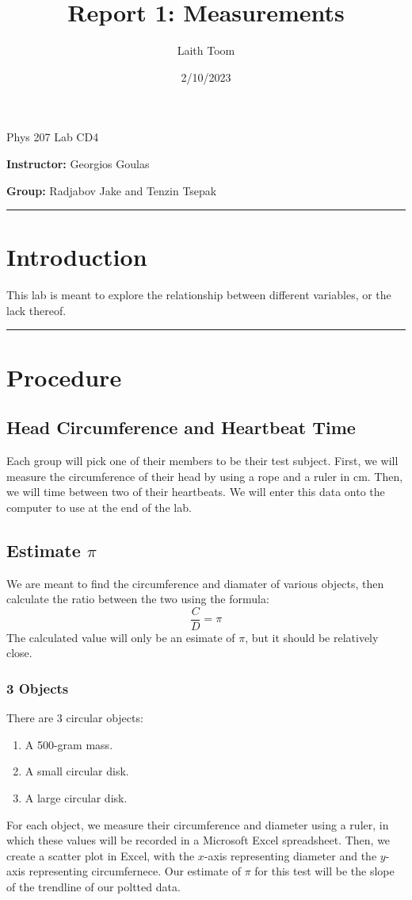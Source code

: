 \documentclass{article}
\title{Report 1: Measurements}
\date{2/10/2023}
\author{Laith Toom}
\begin{document}
\maketitle 

\noindent Phys 207 Lab CD4

\noindent \textbf{Instructor:} Georgios Goulas

\noindent \textbf{Group:} Radjabov Jake and Tenzin Tsepak

\vspace{1em}
\hrule
\section{Introduction}
This lab is meant to explore the relationship between different variables, 
or the lack thereof.

\vspace{1em}
\hrule
\section{Procedure}

\subsection{Head Circumference and Heartbeat Time}
Each group will pick one of their members to be their test subject. First, we will measure the 
circumference of their head by using a rope and a ruler in cm. Then, we will time between 
two of their heartbeats. We will enter this data onto the computer to use at the end of the lab.

\subsection{Estimate $\pi$}
We are meant to find the circumference and diamater of various objects, then calculate 
the ratio between the two using the formula:
\[ \frac{C}{D}=\pi \]
The calculated value will only be an esimate of $\pi$, but it should be relatively close.

\subsubsection{3 Objects}
There are 3 circular objects:
\begin{enumerate}
    \item A 500-gram mass.
    \item A small circular disk.
    \item A large circular disk.
\end{enumerate}
For each object, we measure their circumference and diameter using a ruler, in which these values
will be recorded in a Microsoft Excel spreadsheet. Then, we create a scatter plot in Excel, with 
the $x$-axis representing diameter and the $y$-axis representing circumfernece. Our estimate 
of $\pi$ for this test will be the slope of the trendline of our poltted data.
\end{document}

